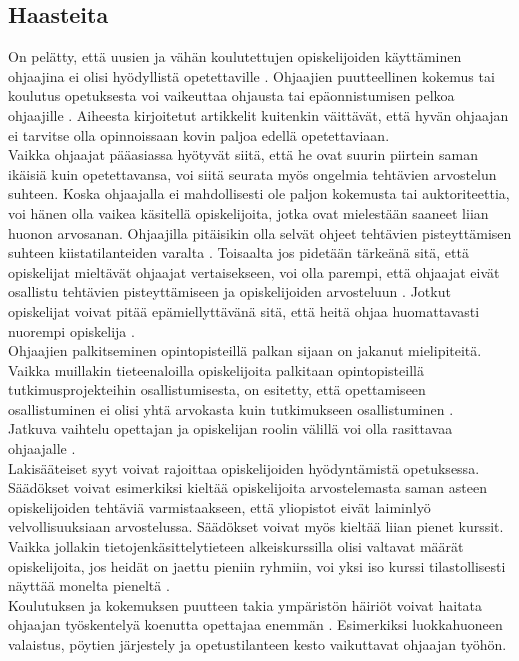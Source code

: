 \documentclass[finnish]{tktltiki2}
\theoremstyle{definition}
\theoremstyle{remark}
\begin{document}
\subsection{Haasteita}
On pelätty, että uusien ja vähän koulutettujen opiskelijoiden käyttäminen ohjaajina ei olisi hyödyllistä opetettaville \cite{Harper02}. Ohjaajien puutteellinen kokemus tai koulutus opetuksesta voi vaikeuttaa ohjausta tai epäonnistumisen pelkoa ohjaajille \cite{Mark11}. Aiheesta kirjoitetut artikkelit kuitenkin väittävät, että hyvän ohjaajan ei tarvitse olla opinnoissaan kovin paljoa edellä opetettaviaan. 
\\
Vaikka ohjaajat pääasiassa hyötyvät siitä, että he ovat suurin piirtein saman ikäisiä kuin opetettavansa, voi siitä seurata myös ongelmia tehtävien arvostelun suhteen. Koska ohjaajalla ei mahdollisesti ole paljon kokemusta tai auktoriteettia, voi hänen olla vaikea käsitellä opiskelijoita, jotka ovat mielestään saaneet liian huonon arvosanan. Ohjaajilla pitäisikin olla selvät ohjeet tehtävien pisteyttämisen suhteen kiistatilanteiden varalta \cite{Roberts95}. Toisaalta jos pidetään tärkeänä sitä, että opiskelijat mieltävät ohjaajat vertaisekseen, voi olla parempi, että ohjaajat eivät osallistu tehtävien pisteyttämiseen ja opiskelijoiden arvosteluun \cite{Morgan02}. Jotkut opiskelijat voivat pitää epämiellyttävänä sitä, että heitä ohjaa huomattavasti nuorempi opiskelija \cite{Sperry08}.
\\
Ohjaajien palkitseminen opintopisteillä palkan sijaan on jakanut mielipiteitä. Vaikka muillakin tieteenaloilla opiskelijoita palkitaan opintopisteillä tutkimusprojekteihin osallistumisesta, on esitetty, että opettamiseen osallistuminen ei olisi yhtä arvokasta kuin tutkimukseen osallistuminen \cite{Reges88}.
\\
Jatkuva vaihtelu opettajan ja opiskelijan roolin välillä voi olla rasittavaa ohjaajalle \cite{Mark11}.
\\
Lakisääteiset syyt voivat rajoittaa opiskelijoiden hyödyntämistä opetuksessa. Säädökset voivat esimerkiksi kieltää opiskelijoita arvostelemasta saman asteen opiskelijoiden tehtäviä varmistaakseen, että yliopistot eivät laiminlyö velvollisuuksiaan arvostelussa. Säädökset voivat myös kieltää liian pienet kurssit. Vaikka jollakin tietojenkäsittelytieteen alkeiskurssilla olisi valtavat määrät opiskelijoita, jos heidät on jaettu pieniin ryhmiin, voi yksi iso kurssi tilastollisesti näyttää monelta pieneltä \cite{Reges03}.
\\
Koulutuksen ja kokemuksen puutteen takia ympäristön häiriöt voivat haitata ohjaajan työskentelyä koenutta opettajaa enemmän \cite{Patitsas12_3}. Esimerkiksi luokkahuoneen valaistus, pöytien järjestely ja opetustilanteen kesto vaikuttavat ohjaajan työhön.
\end{document}
